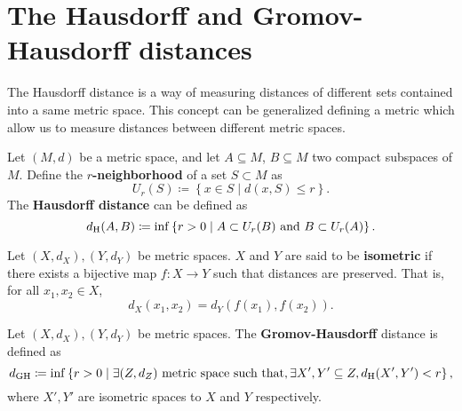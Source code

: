 \section{The Hausdorff and Gromov-Hausdorff distances} \label{sec:preliminaries-hausdorff}

The Hausdorff distance is a way of measuring distances of different sets contained into a same metric space. This concept can be generalized defining a metric which allow us to measure distances between different metric spaces.

\begin{definition} \label{def:hausdorff-distance}
    Let $ (M, d) $ be a metric space, and let $ A \subseteq M $, $ B \subseteq M $ two compact subspaces of $ M $. Define the {\bf $r$-neighborhood} of a set $ S \subset M $ as
    $$
        U_r(S) \coloneq \left\{ x \in S \mid d(x, S) \leq r \right\}.
    $$
    The {\bf Hausdorff distance} can be defined as
    $$
        d_{\operatorname{H}}(A, B) \coloneq \inf \left\{ r > 0 \mid A \subset U_r(B) \text{ and } B \subset U_r(A) \right\}.
    $$
\end{definition}

\begin{definition}
    Let $ (X, d_X), (Y, d_Y) $ be metric spaces. $ X $ and $ Y $ are said to be {\bf isometric} if there exists a bijective map $ f: X \to Y $ such that distances are preserved. That is, for all $ x_1, x_2 \in X $,
    $$
        d_X(x_1, x_2) = d_Y(f(x_1), f(x_2)).
    $$
\end{definition}

\begin{definition} \label{def:dgh}
    Let $ (X, d_X), (Y, d_Y) $ be metric spaces. The {\bf Gromov-Hausdorff} distance is defined as
    \begin{equation}
        d_{\operatorname{GH}} \coloneq \inf \left\{ r > 0 \mid \exists (Z, d_Z) \text{ metric space such that}, \exists X', Y' \subseteq Z, d_{\operatorname{H}}(X', Y') < r \right\},
    \end{equation}
    where $ X', Y' $ are isometric spaces to $ X $ and $ Y $ respectively.
\end{definition}

